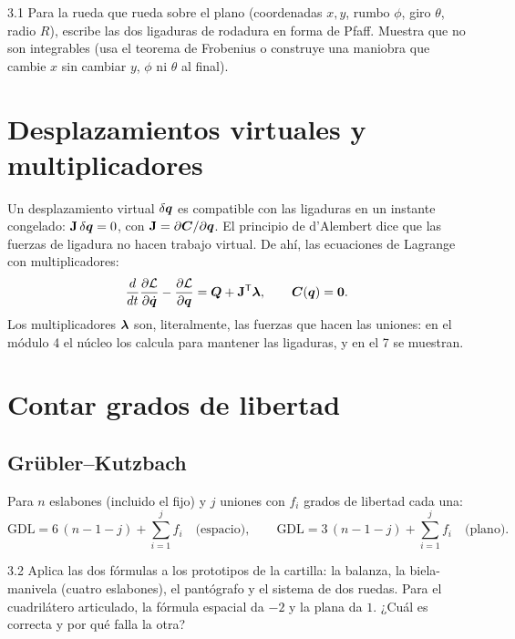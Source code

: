 \documentclass[11pt,a4paper]{article}
\begin{document}
\begin{ejercicio}{3.1}
Para la rueda que rueda sobre el plano (coordenadas $x, y$, rumbo $\phi$, giro $\theta$, radio $R$), escribe las dos
ligaduras de rodadura en forma de Pfaff. Muestra que no son integrables (usa el teorema de Frobenius o construye una
maniobra que cambie $x$ sin cambiar $y$, $\phi$ ni $\theta$ al final).
\end{ejercicio}

\section{Desplazamientos virtuales y multiplicadores}

Un desplazamiento virtual $\delta\bm{q}$ es compatible con las ligaduras en un instante congelado:
$\mathbf J\,\delta\bm{q} = 0$, con $\mathbf J = \partial\bm{C}/\partial\bm{q}$. El principio de d'Alembert dice que
las fuerzas de ligadura no hacen trabajo virtual. De ahí, las ecuaciones de Lagrange con multiplicadores:
\begin{equation}
  \frac{d}{dt}\frac{\partial\mathcal L}{\partial\dot{\bm{q}}} - \frac{\partial\mathcal L}{\partial\bm{q}}
  = \bm{Q} + \mathbf J^{\mathsf T}\bm{\lambda},\qquad \bm{C}(\bm{q}) = \bm{0} .
\end{equation}
Los multiplicadores $\bm{\lambda}$ son, literalmente, las fuerzas que hacen las uniones: en el módulo 4 el núcleo
los calcula para mantener las ligaduras, y en el 7 se muestran.

\section{Contar grados de libertad}

\subsection{Grübler--Kutzbach}
Para $n$ eslabones (incluido el fijo) y $j$ uniones con $f_i$ grados de libertad cada una:
\begin{equation}
  \text{GDL} = 6\,(n - 1 - j) + \sum_{i=1}^{j} f_i\quad\text{(espacio)},\qquad
  \text{GDL} = 3\,(n - 1 - j) + \sum_{i=1}^{j} f_i\quad\text{(plano)}.
\end{equation}

\begin{ejercicio}{3.2}
Aplica las dos fórmulas a los prototipos de la cartilla: la balanza, la biela-manivela (cuatro eslabones), el
pantógrafo y el sistema de dos ruedas. Para el cuadrilátero articulado, la fórmula espacial da $-2$ y la plana da
$1$. ¿Cuál es correcta y por qué falla la otra?
\end{ejercicio}
\end{document}
